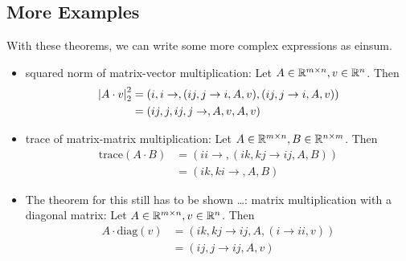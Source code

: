 \subsection{More Examples}
With these theorems, we can write some more complex expressions as einsum.
\begin{itemize}
    \item squared norm of matrix-vector multiplication: Let $A \in \mathbb{R}^{m \times n}, v \in \mathbb{R}^{n}$. Then
          \begin{align*}
              \left| A \cdot v \right|_2^2 & = (i,i\rightarrow,(ij, j \rightarrow i, A, v),(ij, j \rightarrow i, A, v)) \\
                                  & = (ij,j,ij,j\rightarrow,A,v,A,v)
          \end{align*}
    \item trace of matrix-matrix multiplication: Let $A \in \mathbb{R}^{m \times n}, B \in \mathbb{R}^{n \times m}$. Then
          \begin{align*}
              \text{trace}(A \cdot B) & = (ii \rightarrow, (ik, kj \rightarrow ij, A, B)) \\
                                      & = (ik, ki \rightarrow, A, B)
          \end{align*}
    \item The theorem for this still has to be shown \dots:
          matrix multiplication with a diagonal matrix: Let $A \in \mathbb{R}^{m \times n}, v \in \mathbb{R}^{n}$. Then
          \begin{align*}
              A \cdot \text{diag}(v) & = (ik, kj \rightarrow ij, A, (i \rightarrow ii, v)) \\
                                     & = (ij, j \rightarrow ij, A, v)                      \\
          \end{align*}
\end{itemize}
